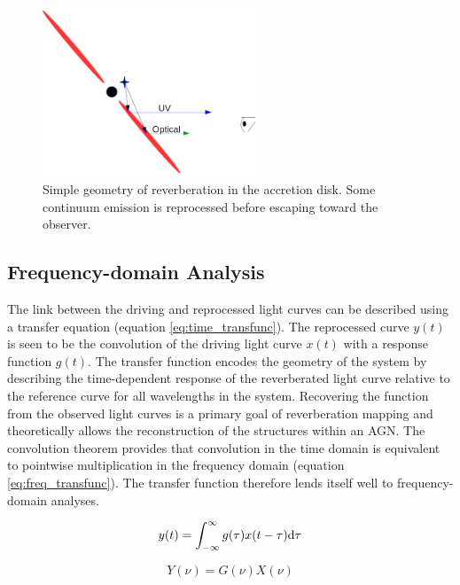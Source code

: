 \documentclass[11pt,letterpaper]{article}
\begin{document}
    \begin{figure}
        \centering
        \includegraphics[width=2.5in]{../img/basic_geometry.png}
        \caption{Simple geometry of reverberation in the accretion disk. Some continuum emission is reprocessed before escaping toward the observer.}
        \label{fig:disk_reverb}
    \end{figure}


    \subsection{Frequency-domain Analysis}
    \label{sec:freq_analysis}

    The link between the driving and reprocessed light curves can be described using a transfer equation (equation \ref{eq:time_transfunc}). The reprocessed curve $y(t)$ is seen to be the convolution of the driving light curve $x(t)$ with a response function $g(t)$. The transfer function encodes the geometry of the system by describing the time-dependent response of the reverberated light curve relative to the reference curve for all wavelengths in the system. Recovering the function from the observed light curves is a primary goal of reverberation mapping and theoretically allows the reconstruction of the structures within an AGN. The convolution theorem provides that convolution in the time domain is equivalent to pointwise multiplication in the frequency domain (equation \ref{eq:freq_transfunc}). The transfer function therefore lends itself well to frequency-domain analyses.

    \begin{equation}
        \label{eq:time_transfunc}
        y(t) = \int_{-\infty}^{\infty} g(\tau) x(t-\tau)  {\rm d}\tau
    \end{equation}

    \begin{equation}
        \label{eq:freq_transfunc}
        Y(\nu) = G(\nu) X(\nu)
    \end{equation}
\end{document}
